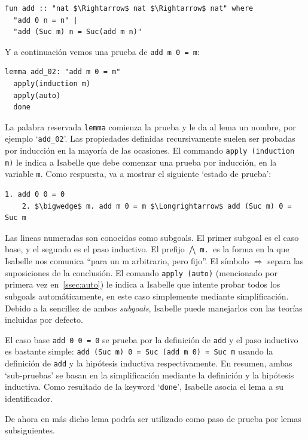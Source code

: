 \documentclass[12pt]{book}
\begin{document}
\begin{lstlisting}[style=Isabelle]
  fun add :: "nat $\Rightarrow$ nat $\Rightarrow$ nat" where
  "add 0 n = n" |
  "add (Suc m) n = Suc(add m n)"
\end{lstlisting}

Y a continuación vemos una prueba de \texttt{add m 0 = m}:
\begin{lstlisting}[style=Isabelle]
  lemma add_02: "add m 0 = m"
  apply(induction m)
  apply(auto)	  
  done
\end{lstlisting}

La palabra reservada \texttt{lemma} comienza la prueba y le da al lema un nombre, por ejemplo `\texttt{add\_02}'. Las propiedades definidas recursivamente suelen ser probadas por inducción en la mayoría de las ocasiones. El commando \texttt{apply (induction m)} le indica a Isabelle que debe comenzar una prueba por inducción, en la variable \texttt{m}. Como respuesta, va a mostrar el siguiente `estado de prueba':

\begin{lstlisting}[style=Isabelle]
	1. add 0 0 = 0
	2. $\bigwedge$ m. add m 0 = m $\Longrightarrow$ add (Suc m) 0 = Suc m	
\end{lstlisting}

Las lineas numeradas son conocidas como subgoals. El primer subgoal es el caso base, y el segundo es el paso inductivo. El prefijo $\bigwedge$ \texttt{m. }es la forma en la que Isabelle nos comunica ``para un m arbitrario, pero fijo''. El símbolo $\Longrightarrow$ separa las suposiciones de la conclusión. El comando \texttt{apply (auto)} (mencionado por primera vez en~\ref{ssec:auto}) le indica a Isabelle que intente probar todos los subgoals automáticamente, en este caso simplemente mediante simplificación. Debido a la sencillez de ambos \textit{subgoals}, Isabelle puede manejarlos con las teorías incluidas por defecto. 

El caso base \texttt{add 0 0 = 0} se prueba por la definición de \texttt{add} y el paso inductivo es bastante simple: \texttt{add (Suc m) 0 = Suc (add m 0) = Suc m} usando la definición de \texttt{add} y la hipótesis inductiva respectivamente. En resumen, ambas `sub-pruebas' se basan en la simplificación mediante la definición y la hipótesis inductiva. Como resultado de la keyword `\texttt{done}', Isabelle asocia el lema a su identificador.

De ahora en más dicho lema podría ser utilizado como paso de prueba por lemas subsiguientes.
\end{document}
